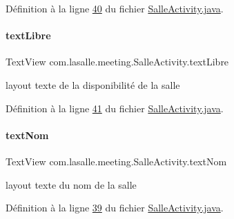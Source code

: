 Définition à la ligne \hyperlink{_salle_activity_8java_source_l00040}{40} du fichier \hyperlink{_salle_activity_8java_source}{Salle\+Activity.\+java}.

\mbox{\label{classcom_1_1lasalle_1_1meeting_1_1_salle_activity_a3d80063be535c4f343498d1d0616092d}} 
\paragraph{\texorpdfstring{text\+Libre}{textLibre}}
{\footnotesize\ttfamily Text\+View com.\+lasalle.\+meeting.\+Salle\+Activity.\+text\+Libre\hspace{0.3cm}{\ttfamily [private]}}



layout texte de la disponibilité de la salle 



Définition à la ligne \hyperlink{_salle_activity_8java_source_l00041}{41} du fichier \hyperlink{_salle_activity_8java_source}{Salle\+Activity.\+java}.

\mbox{\label{classcom_1_1lasalle_1_1meeting_1_1_salle_activity_acb7acab3be7f76509ac3de29e715e008}} 
\paragraph{\texorpdfstring{text\+Nom}{textNom}}
{\footnotesize\ttfamily Text\+View com.\+lasalle.\+meeting.\+Salle\+Activity.\+text\+Nom\hspace{0.3cm}{\ttfamily [private]}}



layout texte du nom de la salle 



Définition à la ligne \hyperlink{_salle_activity_8java_source_l00039}{39} du fichier \hyperlink{_salle_activity_8java_source}{Salle\+Activity.\+java}.

